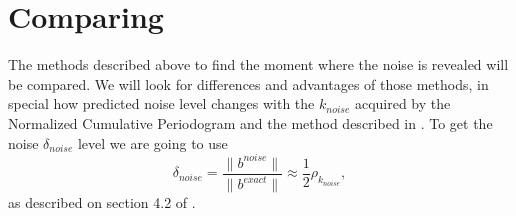 \section{Comparing}
The methods described above to find the moment where the noise is revealed
will be compared. We will look for differences and advantages of those methods, in special
how predicted noise level changes with the $k_{noise}$ acquired by the Normalized Cumulative
Periodogram and the method described in \cite{bidiagonalization}. To get the noise $\delta_{noise}$
level we are going to use 
\begin{equation*}
	\delta_{noise} = \frac{\|b^{noise}\|}{\|b^{exact}\|} \approx \frac{1}{2}\rho_{k_{noise}},
\end{equation*}
as described on section 4.2 of \cite{bidiagonalization}.